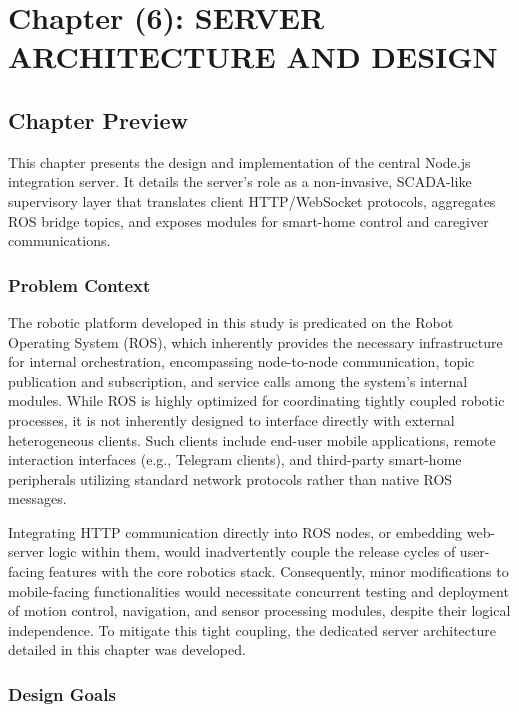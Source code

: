 \setcounter{chapter}{6}
\chapter*{Chapter (6): SERVER ARCHITECTURE AND DESIGN}
\setcounter{section}{0}


\section{Chapter Preview}
\label{sec:ch8_intro}
This chapter presents the design and implementation of the central Node.js integration server. It details the server's role as a non-invasive, SCADA-like supervisory layer that translates client HTTP/WebSocket protocols, aggregates ROS bridge topics, and exposes modules for smart-home control and caregiver communications.

\subsection{Problem Context}
\label{sec:ch8_problem}

The robotic platform developed in this study is predicated on the Robot Operating System (ROS), which inherently provides the necessary infrastructure for internal orchestration, encompassing node-to-node communication, topic publication and subscription, and service calls among the system's internal modules. While ROS is highly optimized for coordinating tightly coupled robotic processes, it is not inherently designed to interface directly with external heterogeneous clients. Such clients include end-user mobile applications, remote interaction interfaces (e.g., Telegram clients), and third-party smart-home peripherals utilizing standard network protocols rather than native ROS messages.

Integrating HTTP communication directly into ROS nodes, or embedding web-server logic within them, would inadvertently couple the release cycles of user-facing features with the core robotics stack. Consequently, minor modifications to mobile-facing functionalities would necessitate concurrent testing and deployment of motion control, navigation, and sensor processing modules, despite their logical independence. To mitigate this tight coupling, the dedicated server architecture detailed in this chapter was developed.

\subsection{Design Goals}
\label{sec:ch8_goals}

